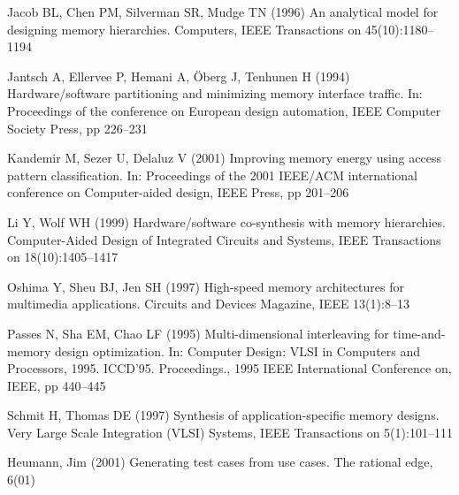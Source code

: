\documentclass[smallcondensed]{svjour3}
\begin{document}
\begin{thebibliography}{41}
Jacob BL, Chen PM, Silverman SR, Mudge TN (1996) An analytical model for
  designing memory hierarchies. Computers, IEEE Transactions on
  45(10):1180--1194

Jantsch A, Ellervee P, Hemani A, {\"O}berg J, Tenhunen H (1994)
  Hardware/software partitioning and minimizing memory interface traffic. In:
  Proceedings of the conference on European design automation, IEEE Computer
  Society Press, pp 226--231

Kandemir M, Sezer U, Delaluz V (2001) Improving memory energy using access
  pattern classification. In: Proceedings of the 2001 IEEE/ACM international
  conference on Computer-aided design, IEEE Press, pp 201--206

Li Y, Wolf WH (1999) Hardware/software co-synthesis with memory hierarchies.
  Computer-Aided Design of Integrated Circuits and Systems, IEEE Transactions
  on 18(10):1405--1417

Oshima Y, Sheu BJ, Jen SH (1997) High-speed memory architectures for multimedia
  applications. Circuits and Devices Magazine, IEEE 13(1):8--13

Passes N, Sha EM, Chao LF (1995) Multi-dimensional interleaving for
  time-and-memory design optimization. In: Computer Design: VLSI in Computers
  and Processors, 1995. ICCD'95. Proceedings., 1995 IEEE International
  Conference on, IEEE, pp 440--445

Schmit H, Thomas DE (1997) Synthesis of application-specific memory designs.
  Very Large Scale Integration (VLSI) Systems, IEEE Transactions on
  5(1):101--111
 
Heumann, Jim (2001) Generating test cases from use cases.
	The rational edge, 6(01)

\end{thebibliography}
\end{document}
